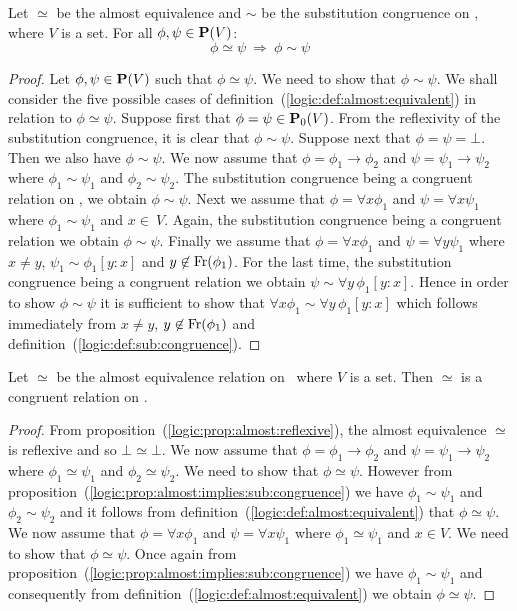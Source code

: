 \begin{prop}\label{logic:prop:almost:implies:sub:congruence}
Let $\simeq$ be the almost equivalence and $\sim$ be the
substitution congruence on \pv, where $V$ is a set. For all
$\phi,\psi\in\mbox{${\bf P}(V)$}$:
    \[
    \phi\simeq\psi\ \Rightarrow\ \phi\sim\psi
    \]
\end{prop}
\begin{proof}
Let $\phi,\psi\in\mbox{${\bf P}(V)$}$ such that $\phi\simeq\psi$. We need to show
that $\phi\sim\psi$. We shall consider the five possible cases of
definition~(\ref{logic:def:almost:equivalent}) in relation to
$\phi\simeq\psi$. Suppose first that $\phi=\psi\in\mbox{${\bf P}_{0}(V)$}$. From the
reflexivity of the substitution congruence, it is clear that
$\phi\sim\psi$. Suppose next that $\phi=\psi=\bot$. Then we also
have $\phi\sim\psi$. We now assume that $\phi=\phi_{1}\to\phi_{2}$
and $\psi=\psi_{1}\to\psi_{2}$ where $\phi_{1}\sim\psi_{1}$ and
$\phi_{2}\sim\psi_{2}$. The substitution congruence being a
congruent relation on \pv, we obtain $\phi\sim\psi$. Next we assume
that $\phi=\forall x\phi_{1}$ and $\psi=\forall x\psi_{1}$ where
$\phi_{1}\sim\psi_{1}$ and $x\in\ V$. Again, the substitution
congruence being a congruent relation we obtain $\phi\sim\psi$.
Finally we assume that $\phi=\forall x\phi_{1}$ and $\psi=\forall
y\psi_{1}$ where $x\neq y$, $\psi_{1}\sim\phi_{1}[y\!:\!x]$ and
$y\not\in\mbox{\rm Fr}(\phi_{1})$. For the last time, the substitution
congruence being a congruent relation we obtain $\psi\sim \forall
y\, \phi_{1}[y\!:\!x]$. Hence in order to show $\phi\sim\psi$ it is
sufficient to show that $\forall x\phi_{1}\sim\forall
y\,\phi_{1}[y\!:\!x]$ which follows immediately from $x\neq y$,
$y\not\in\mbox{\rm Fr}(\phi_{1})$ and
definition~(\ref{logic:def:sub:congruence}).
\end{proof}

\begin{prop}\label{logic:prop:almost:congruent}
Let $\simeq$ be the almost equivalence relation on \pv\ where $V$ is
a set. Then $\simeq$ is a congruent relation on \pv.
\end{prop}
\begin{proof}
From proposition~(\ref{logic:prop:almost:reflexive}), the almost
equivalence $\simeq$ is reflexive and so $\bot\simeq\bot$. We now
assume that $\phi=\phi_{1}\to\phi_{2}$ and
$\psi=\psi_{1}\to\psi_{2}$ where $\phi_{1}\simeq\psi_{1}$ and
$\phi_{2}\simeq\psi_{2}$. We need to show that $\phi\simeq\psi$.
However from
proposition~(\ref{logic:prop:almost:implies:sub:congruence}) we have
$\phi_{1}\sim\psi_{1}$ and $\phi_{2}\sim\psi_{2}$ and it follows
from definition~(\ref{logic:def:almost:equivalent}) that
$\phi\simeq\psi$. We now assume that $\phi=\forall x\phi_{1}$ and
$\psi=\forall x\psi_{1}$ where $\phi_{1}\simeq\psi_{1}$ and $x\in
V$. We need to show that $\phi\simeq\psi$. Once again from
proposition~(\ref{logic:prop:almost:implies:sub:congruence}) we have
$\phi_{1}\sim\psi_{1}$ and consequently from
definition~(\ref{logic:def:almost:equivalent}) we obtain
$\phi\simeq\psi$.
\end{proof}

